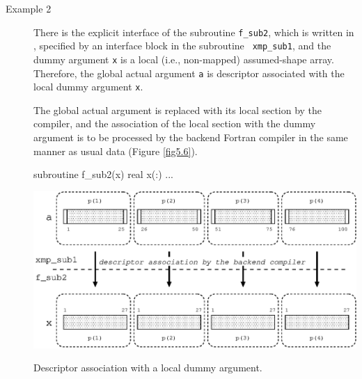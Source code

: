\begin{description}
\item[Example 2]

	   There is the explicit interface of the subroutine
	   {\tt f\_sub2}, which is written in {\Fort},
	   specified by an interface block in the subroutine {\tt
	   xmp\_sub1}, and the dummy argument {\tt x} is a local
	   (i.e., non-mapped) assumed-shape array. Therefore, the global
	   actual argument {\tt a} is descriptor associated with the
	   local dummy argument {\tt x}.

	   The global actual argument is replaced with its local section
	   by the {\XMP} compiler, and the association of the local
	   section with the dummy argument is to be processed by the
	   backend Fortran compiler in the same manner as usual data 
	   (Figure \ref{fig5.6}).

\begin{Fexample}
      subroutine f_sub2(x)
      real x(:)
      ...
\end{Fexample}

\begin{myfigure}
 \includegraphics[scale=0.7]{figs/fig5.6.eps}
 \caption{Descriptor association with a local dummy argument.}
 \label{fig5.6}
\end{myfigure}

\end{description}


